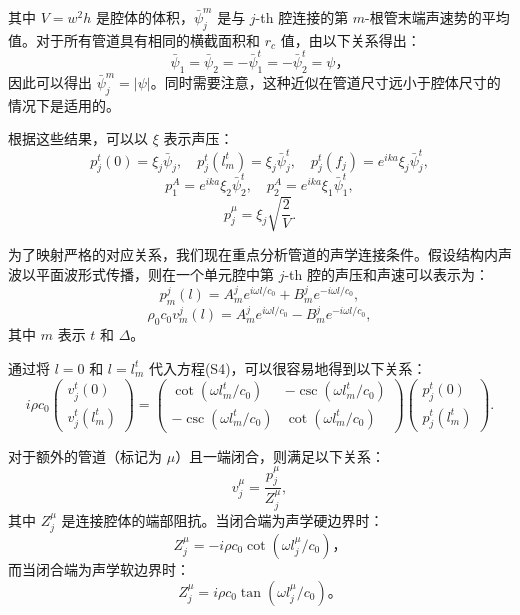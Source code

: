 其中 \( V = w^2 h \) 是腔体的体积，\( \bar{\psi}_j^m \) 是与 \( j \)-th 腔连接的第 \( m \)-根管末端声速势的平均值。对于所有管道具有相同的横截面积和 \( r_c \) 值，由以下关系得出：
\[
\bar{\psi}_1 = \bar{\psi}_2 = -\bar{\psi}_1^t = -\bar{\psi}_2^t = \psi，
\]
因此可以得出 \( \bar{\psi}_j^m = |\psi| \)。同时需要注意，这种近似在管道尺寸远小于腔体尺寸的情况下是适用的。

根据这些结果，可以以 \( \xi \) 表示声压：
\[
p_j^t(0) = \xi_j \bar{\psi}_j, \quad
p_j^t(l_m^t) = \xi_j \bar{\psi}_j^t, \quad
p_j^t(f_j) = e^{ika} \xi_j \bar{\psi}_j^t,
\]
\[
p_1^A = e^{ika} \xi_2 \bar{\psi}_2^t, \quad
p_2^A = e^{ika} \xi_1 \bar{\psi}_1^t,
\]
\[
p_j^\mu = \xi_j \sqrt{\frac{2}{V}}. 
\]

为了映射严格的对应关系，我们现在重点分析管道的声学连接条件。假设结构内声波以平面波形式传播，则在一个单元腔中第 \( j \)-th 腔的声压和声速可以表示为：
\[
p_m^j(l) = A_m^j e^{i\omega l/c_0} + B_m^j e^{-i\omega l/c_0},
\]
\[
\rho_0 c_0 v_m^j(l) = A_m^j e^{i\omega l/c_0} - B_m^j e^{-i\omega l/c_0}, 
\]
其中 \( m \) 表示 \( t \) 和 \( \Delta \)。

通过将 \( l = 0 \) 和 \( l = l_m^t \) 代入方程(S4)，可以很容易地得到以下关系：
\[
i\rho c_0
\begin{pmatrix}
v_j^t(0) \\
v_j^t(l_m^t)
\end{pmatrix}
=
\begin{pmatrix}
\cot(\omega l_m^t / c_0) & -\csc(\omega l_m^t / c_0) \\
-\csc(\omega l_m^t / c_0) & \cot(\omega l_m^t / c_0)
\end{pmatrix}
\begin{pmatrix}
p_j^t(0) \\
p_j^t(l_m^t)
\end{pmatrix}. 
\]

对于额外的管道（标记为 \( \mu \)）且一端闭合，则满足以下关系：
\[
v_j^\mu = \frac{p_j^\mu}{Z_j^\mu},
\]
其中 \( Z_j^\mu \) 是连接腔体的端部阻抗。当闭合端为声学硬边界时：
\[
Z_j^\mu = -i\rho c_0 \cot(\omega l_j^\mu / c_0)，
\]
而当闭合端为声学软边界时：
\[
Z_j^\mu = i\rho c_0 \tan(\omega l_j^\mu / c_0)。
\]

